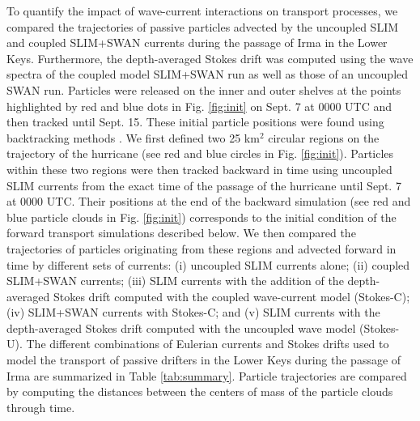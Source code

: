 To quantify the impact of wave-current interactions on transport processes, we compared the trajectories of passive particles advected by the uncoupled SLIM and coupled SLIM+SWAN currents during the passage of Irma in the Lower Keys. Furthermore, the depth-averaged Stokes drift was computed using the wave spectra of the coupled model SLIM+SWAN run as well as those of an uncoupled SWAN run. Particles were released on the inner and outer shelves at the points highlighted by red and blue dots in Fig. \ref{fig:init} on Sept. 7 at 0000 UTC and then tracked until Sept. 15. These initial particle positions were found using backtracking methods \citep{spivakovskaya2005simulation} . We first defined two 25 km$^\text{2}$ circular regions on the trajectory of the hurricane (see red and blue circles in Fig. \ref{fig:init}). Particles within these two regions were then tracked backward in time using uncoupled SLIM currents from the exact time of the passage of the hurricane until Sept. 7 at 0000 UTC. Their positions at the end of the backward simulation (see red and blue particle clouds in Fig. \ref{fig:init}) corresponds to the initial condition of the forward transport simulations described below. We then compared the trajectories of particles originating from these regions and advected forward in time by different sets of currents: (i) uncoupled SLIM currents alone; (ii) coupled SLIM+SWAN currents; (iii) SLIM currents with the addition of the depth-averaged Stokes drift computed with the coupled wave-current model (Stokes-C); (iv) SLIM+SWAN currents with Stokes-C; and (v) SLIM currents with the depth-averaged Stokes drift computed with the uncoupled wave model (Stokes-U). The different combinations of Eulerian currents and Stokes drifts used to model the transport of passive drifters in the Lower Keys during the passage of Irma are summarized in Table \ref{tab:summary}. Particle trajectories are compared by computing the distances between the centers of mass of the particle clouds through time.

